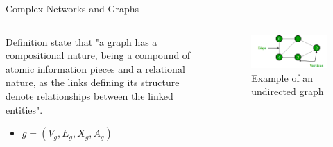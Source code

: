 \documentclass[xcolor=dvipsnames,table]{beamer}
\begin{document}
\begin{frame}{Complex Networks and Graphs}
        \begin{columns}
                \begin{block}{Definition}
                        \citealp{Bacciu_2020} state that "a graph has a compositional nature, being 
                        a compound of atomic information pieces and a relational nature, as the links
                        defining its structure denote relationships between the linked entities".

                        \begin{itemize}
                                \item \textit{$g = (V_g, E_g, X_g, A_g)$}
                        \end{itemize}
                \end{block}
                \centering
                \begin{figure}[H]
                        \centering
                        \includegraphics[scale=0.35]{images/undirectedgraph.png}
                        \caption{Example of an undirected graph}
                \end{figure}
        \end{columns}
\end{frame}
\end{document}
